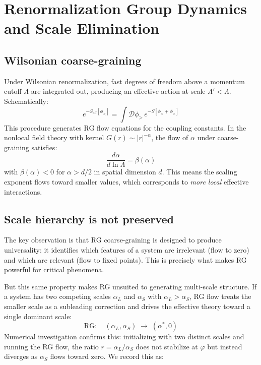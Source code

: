 \documentclass[11pt,a4paper]{article}
\theoremstyle{plain}
\theoremstyle{definition}
\newcommand{\phiGolden}{\varphi}
\begin{document}
\section{Renormalization Group Dynamics and Scale Elimination}
\label{sec:rg}

\subsection{Wilsonian coarse-graining}

Under Wilsonian renormalization, fast degrees of freedom above a momentum
cutoff $\Lambda$ are integrated out, producing an effective action at
scale $\Lambda' < \Lambda$. Schematically:
\begin{equation}
e^{-S_{\text{eff}}[\phi_{<}]} = \int \mathcal{D}\phi_{>}\,
e^{-S[\phi_{<} + \phi_{>}]}
\end{equation}
This procedure generates RG flow equations for the coupling constants.
In the nonlocal field theory with kernel $G(r) \sim |r|^{-\alpha}$,
the flow of $\alpha$ under coarse-graining satisfies:
\begin{equation}
\frac{d\alpha}{d\ln\Lambda} = \beta(\alpha)
\end{equation}
with $\beta(\alpha) < 0$ for $\alpha > d/2$ in spatial dimension $d$.
This means the scaling exponent flows toward smaller values, which
corresponds to \emph{more local} effective interactions.

\subsection{Scale hierarchy is not preserved}

The key observation is that RG coarse-graining is designed to produce
universality: it identifies which features of a system are irrelevant
(flow to zero) and which are relevant (flow to fixed points). This
is precisely what makes RG powerful for critical phenomena.

But this same property makes RG unsuited to generating multi-scale
structure. If a system has two competing scales $\alpha_L$ and
$\alpha_S$ with $\alpha_L > \alpha_S$, RG flow treats the smaller scale
as a subleading correction and drives the effective theory toward a
single dominant scale:
\begin{equation}
\text{RG}: \quad (\alpha_L, \alpha_S) \;\longrightarrow\; (\alpha^*, 0)
\end{equation}
Numerical investigation confirms this: initializing with two distinct
scales and running the RG flow, the ratio $r = \alpha_L / \alpha_S$
does not stabilize at $\phiGolden$ but instead diverges as $\alpha_S$
flows toward zero. We record this as:
\end{document}
